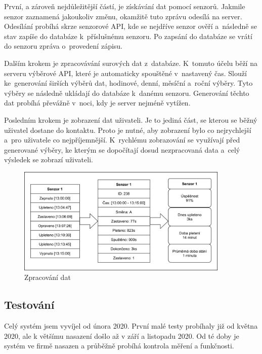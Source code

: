 \documentclass[12pt, a4paper]{article}
\begin{document}
První, a zároveň nejdůležitější částí, je získávání dat pomocí senzorů.
Jakmile senzor zaznamená jakoukoliv změnu, okamžitě tuto zprávu odesílá na server.
Odesílání probíhá skrze senzorové API, kde se nejdříve senzor ověří a~následně se stav zapíše do databáze k~příslušnému senzoru.
Po zapsání do databáze se vrátí do senzoru zpráva o~provedení zápisu. 

Dalším krokem je zpracovávání surových dat z~databáze.
K~tomuto účelu běží na serveru výběrové API, které je automaticky spouštěné v~nastavený čas.
Slouží ke~generování širších výběrů dat, hodinové, denní, měsíční a~roční výběry.
Tyto výběry se následně ukládají do databáze k~danému senzoru.
Generování těchto dat probíhá převážně v~noci, kdy je server nejméně vytížen.

Posledním krokem je zobrazení dat uživateli.
Je to jediná část, se kterou se běžný uživatel dostane do kontaktu.
Proto je nutné, aby zobrazení bylo co nejrychlejší a~pro uživatele co nejpříjemnější.
K~rychlému zobrazování se využívají před generované výběry, ke kterým se dopočítají dosud nezpracovaná data a~celý výsledek se zobrazí uživateli.

\begin{figure}[t]
    \centering
    \includegraphics[width=0.9\textwidth]{img/Princip.png}
    \caption{Zpracování dat}
    \label{fig:princip}
\end{figure}


\subsection*{Testování}
Celý systém jsem vyvíjel od února 2020. První malé testy probíhaly již od května 2020, ale k většímu nasazení došlo až v září a listopadu 2020.
Od té doby je systém ve firmě nasazen a průběžně probíhá kontrola měření a funkčnosti.
\end{document}

